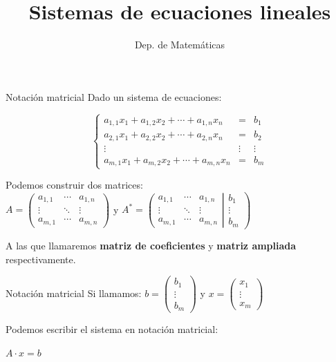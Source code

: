 \documentclass[11pt]{beamer}
\title{Sistemas de ecuaciones lineales}
\date{}
\author{Dep. de Matemáticas}
\begin{document}
\begin{frame}
\titlepage
\end{frame}


\begin{frame}{Notación matricial}
Dado un sistema de ecuaciones: 

$${\displaystyle \left\{{\begin{matrix}a_{1,1}x_{1}+a_{1,2}x_{2}+\cdots +a_{1,n}x_{n}&=&b_{1}\\a_{2,1}x_{1}+a_{2,2}x_{2}+\cdots +a_{2,n}x_{n}&=&b_{2}\\\vdots & \vdots & \vdots \\a_{m,1}x_{1}+a_{m,2}x_{2}+\cdots +a_{m,n}x_{n}&=&b_{m}\end{matrix}}\right.}$$

Podemos construir dos matrices: \\

${\displaystyle A={\begin{pmatrix}a_{1,1}&\cdots &a_{1,n}\\\vdots &\ddots &\vdots \\a_{m,1}&\cdots &a_{m,n}\end{pmatrix}}}$ y 
${\displaystyle A^{*}=\left({\begin{matrix}a_{1,1}&\cdots &a_{1,n}\\\vdots &\ddots &\vdots \\a_{m,1}&\cdots &a_{m,n}\end{matrix}}\right|\left.{\begin{matrix}b_{1}\\\vdots \\b_{m}\end{matrix}}\right)}$

A las que llamaremos \textbf{matriz de coeficientes} y \textbf{matriz ampliada} respectivamente.
\end{frame}

\begin{frame}{Notación matricial}
Si llamamos:
${\displaystyle b={\begin{pmatrix}b_{1}\\ \vdots \\b_{m}\end{pmatrix}}}$ y ${\displaystyle x={\begin{pmatrix}x_{1}\\ \vdots \\x_{m}\end{pmatrix}}}$


    \begin{block}{}
    Podemos escribir el sistema en notación matricial:
    \begin{center}
    $A \cdot x = b$
    \end{center}
    \end{block}

   

\end{frame}
\end{document}
